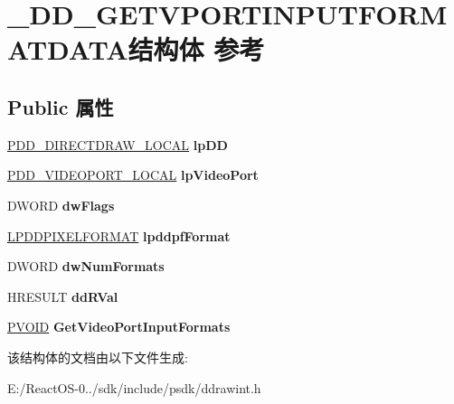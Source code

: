 \hypertarget{struct___d_d___g_e_t_v_p_o_r_t_i_n_p_u_t_f_o_r_m_a_t_d_a_t_a}{}\section{\+\_\+\+D\+D\+\_\+\+G\+E\+T\+V\+P\+O\+R\+T\+I\+N\+P\+U\+T\+F\+O\+R\+M\+A\+T\+D\+A\+T\+A结构体 参考}
\label{struct___d_d___g_e_t_v_p_o_r_t_i_n_p_u_t_f_o_r_m_a_t_d_a_t_a}
\subsection*{Public 属性}
\begin{DoxyCompactItemize}
\item 
\mbox{\label{struct___d_d___g_e_t_v_p_o_r_t_i_n_p_u_t_f_o_r_m_a_t_d_a_t_a_a8396d4f1d1914ead98c73a4716480e9b}} 
\hyperlink{struct___d_d___d_i_r_e_c_t_d_r_a_w___l_o_c_a_l}{P\+D\+D\+\_\+\+D\+I\+R\+E\+C\+T\+D\+R\+A\+W\+\_\+\+L\+O\+C\+AL} {\bfseries lp\+DD}
\item 
\mbox{\label{struct___d_d___g_e_t_v_p_o_r_t_i_n_p_u_t_f_o_r_m_a_t_d_a_t_a_a458f952377be8f4b4677cd0b5173e2b2}} 
\hyperlink{struct___d_d___v_i_d_e_o_p_o_r_t___l_o_c_a_l}{P\+D\+D\+\_\+\+V\+I\+D\+E\+O\+P\+O\+R\+T\+\_\+\+L\+O\+C\+AL} {\bfseries lp\+Video\+Port}
\item 
\mbox{\label{struct___d_d___g_e_t_v_p_o_r_t_i_n_p_u_t_f_o_r_m_a_t_d_a_t_a_a190f24a2f84f9156eddc90b651b481cc}} 
D\+W\+O\+RD {\bfseries dw\+Flags}
\item 
\mbox{\label{struct___d_d___g_e_t_v_p_o_r_t_i_n_p_u_t_f_o_r_m_a_t_d_a_t_a_a6166da9f9faf16115f243e3139e6ba5a}} 
\hyperlink{interfacevoid}{L\+P\+D\+D\+P\+I\+X\+E\+L\+F\+O\+R\+M\+AT} {\bfseries lpddpf\+Format}
\item 
\mbox{\label{struct___d_d___g_e_t_v_p_o_r_t_i_n_p_u_t_f_o_r_m_a_t_d_a_t_a_af20eff3ec0a9ae38467d21dd151f1813}} 
D\+W\+O\+RD {\bfseries dw\+Num\+Formats}
\item 
\mbox{\label{struct___d_d___g_e_t_v_p_o_r_t_i_n_p_u_t_f_o_r_m_a_t_d_a_t_a_ab7ac42de121c4d42e5040e4444255d9d}} 
H\+R\+E\+S\+U\+LT {\bfseries dd\+R\+Val}
\item 
\mbox{\label{struct___d_d___g_e_t_v_p_o_r_t_i_n_p_u_t_f_o_r_m_a_t_d_a_t_a_acf312e6658025dbfadf28866418f2c63}} 
\hyperlink{interfacevoid}{P\+V\+O\+ID} {\bfseries Get\+Video\+Port\+Input\+Formats}
\end{DoxyCompactItemize}


该结构体的文档由以下文件生成\+:\begin{DoxyCompactItemize}
\item 
E\+:/\+React\+O\+S-\/0../sdk/include/psdk/ddrawint.\+h\end{DoxyCompactItemize}

